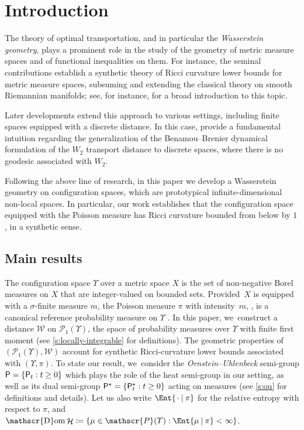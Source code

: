 \documentclass[JEP,XML,SOM,Unicode,published]{cedram}
\theoremstyle{definition}
\theoremstyle{remark}
\DeclarePairedDelimiter{\set}{\lbrace}{\rbrace}
\newcommand{\given}[1][]{%
\nonscript\:#1\vert
\allowbreak
\nonscript\:
\mathopen{}}
\DeclareMathOperator{\ent}{\mathcal{H}}
\DeclareMathOperator{\dom}{\mathscr{D}om}
\begin{document}
\maketitle
\tableofcontents


\vspace*{-2.5\baselineskip}\enlargethispage{.5\baselineskip}\mbox{}
\section{Introduction}
The theory of optimal transportation, and in particular the \emph{Wasserstein geometry}, plays a prominent role in the study of the geometry of metric measure spaces and of functional inequalities on them.
For instance, the seminal contributions \cite{Sturm,LottVillani,AGSDuke} establish a synthetic theory of Ricci curvature lower bounds for metric measure spaces, subsuming and extending the classical theory on smooth Riemannian manifolds; see, for instance, \cite[Part\,III]{VillaniOldAndNew} for a broad introduction to this topic.

Later developments extend this approach to various settings, including finite spaces equipped with a discrete distance.
In this case, \cite{Maas,Mielke} provide a fundamental intuition regarding the generalization of the Benamou--Brenier dynamical formulation of the $W_{2}$ transport distance to discrete spaces, where there is no geodesic associated with $W_{2}$.

Following the above line of research, in this paper we develop a Wasserstein geom\-etry on configuration spaces, which are prototypical infinite-dimensional non-local spaces.
In particular, our work establishes that the configuration space equipped with the Poisson measure has Ricci curvature bounded from below by $1$, in a synthetic sense.

\subsection{Main results}
The configuration space $\varUpsilon$ over a metric space $X$ is the set of non-negative Borel measures on $X$ that are integer-valued on bounded sets.
Provided~$X$ is equipped with a $\sigma$-finite measure $m$, the Poisson measure $\pi$ with intensity~$m$, \eg \cite[Ch.\,3]{LastPenrose}, is a canonical reference probability measure on $\varUpsilon$ .
In this paper, we~construct a distance $\mathcal{W}$ on $\mathscr{P}_{1}(\varUpsilon)$, the space of probability measures over $\varUpsilon$ with finite first moment (see \cref{s:locally-integrable} for definitions).
The geometric properties of $(\mathscr{P}_{1}(\varUpsilon), \mathcal{W})$ account for synthetic Ricci-curvature lower bounds associated with $(\varUpsilon, \pi)$.
To state our result, we~consider the \emph{Ornstein--Uhlenbeck} semi-group $\mathsf{P} = \set{ \mathsf{P}_{t} : t \geq 0 }$ which plays the role of the heat semi-group in our setting, as well as its dual semi-group $\mathsf{P}^{\star} = \set{ \mathsf{P}^{\star}_{t} : t \geq 0 }$ acting on measures (see \cref{s:ou} for definitions and details).
Let us also write $\Ent{\,\cdot \given \pi}$ for the relative entropy with respect to $\pi$, and $\dom \ent \coloneq \set{ \mu \in \mathscr{P}(\varUpsilon) : \Ent{ \mu \given \pi } < \infty }$.
\end{document}
